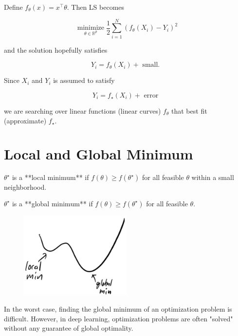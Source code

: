 \documentclass{report}
\begin{document}
\begin{concept}
    Define $f_{\theta}(x)=x^{\top} \theta$.
    Then LS becomes

    $$
    \underset{\theta \in \mathbb{R}^{p}}{\operatorname{minimize}} \frac{1}{2} \sum_{i=1}^{N}\left(f_{\theta}\left(X_{i}\right)-Y_{i}\right)^{2}
    $$

    and the solution hopefully satisfies

    $$
    Y_{i}=f_{\theta}\left(X_{i}\right)+\text { small. }
    $$

    Since $X_{i}$ and $Y_{i}$ is assumed to satisfy

    $$
    Y_{i}=f_{\star}\left(X_{i}\right)+\text { error }
    $$

    we are searching over linear functions (linear curves) $f_{\theta}$ that best fit (approximate) $f_{\star}$.
\end{concept}

\section{Local and Global Minimum}

\begin{definition}
    $\theta^{\star}$ is a **local minimum** if $f(\theta) \geq f\left(\theta^{\star}\right)$ for all feasible $\theta$ within a small neighborhood.

    $\theta^{\star}$ is a **global minimum** if $f(\theta) \geq f\left(\theta^{\star}\right)$ for all feasible $\theta$.

    \begin{figure}[H]
        \centering
        \includegraphics[width=0.5\textwidth]{./1.1.jpg}
    \end{figure}

    In the worst case, finding the global minimum of an optimization problem is difficult.
    However, in deep learning, optimization problems are often "solved" without any guarantee of global optimality.
\end{definition}
\end{document}
